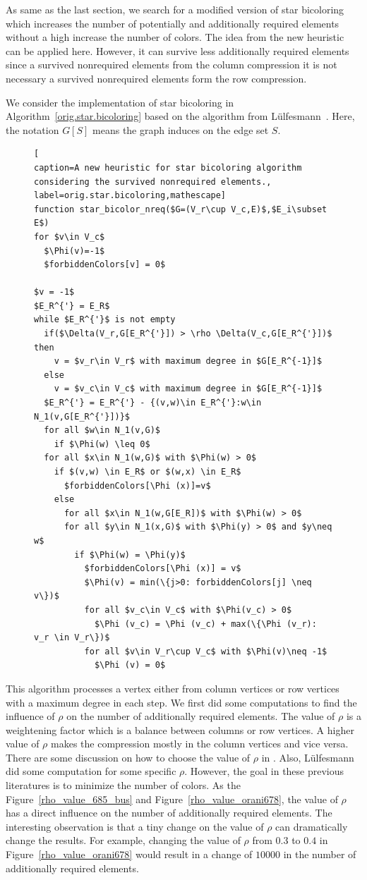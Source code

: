 \documentclass[12pt, twoside,a4paper,toc=bibliography]{scrbook}
\newcommand{\figref}[1]{Figure~\protect\ref{#1}}
\newcommand{\coderef}[1]{Algorithm~\protect\ref{#1}}
\begin{document}
As same as the last section, we search for a modified version of star bicoloring
which increases the number of potentially and additionally required elements without
a high increase the number of colors. The idea from the new heuristic
can be applied here. However, it can survive less additionally required
elements since a survived nonrequired elements from the column compression
it is not necessary a survived nonrequired elements form the row compression.

We consider the implementation of star bicoloring in \coderef{orig.star.bicoloring} based on
the algorithm from Lülfesmann~\cite{Lulfesmann2012Fap}.
Here, the notation $G[S]$ means the graph induces on the edge set $S$.
\begin{figure}
\begin{lstlisting}[
caption=A new heuristic for star bicoloring algorithm
considering the survived nonrequired elements.,
label=orig.star.bicoloring,mathescape]
function star_bicolor_nreq($G=(V_r\cup V_c,E)$,$E_i\subset E$)
for $v\in V_c$
  $\Phi(v)=-1$
  $forbiddenColors[v] = 0$

$v = -1$
$E_R^{'} = E_R$
while $E_R^{'}$ is not empty
  if($\Delta(V_r,G[E_R^{'}]) > \rho \Delta(V_c,G[E_R^{'}])$ then
    v = $v_r\in V_r$ with maximum degree in $G[E_R^{-1}]$
  else
    v = $v_c\in V_c$ with maximum degree in $G[E_R^{-1}]$
  $E_R^{'} = E_R^{'} - {(v,w)\in E_R^{'}:w\in N_1(v,G[E_R^{'}])}$
  for all $w\in N_1(v,G)$
    if $\Phi(w) \leq 0$
  for all $x\in N_1(w,G)$ with $\Phi(w) > 0$
    if $(v,w) \in E_R$ or $(w,x) \in E_R$
      $forbiddenColors[\Phi (x)]=v$
    else
      for all $x\in N_1(w,G[E_R])$ with $\Phi(w) > 0$
      for all $y\in N_1(x,G)$ with $\Phi(y) > 0$ and $y\neq w$
        if $\Phi(w) = \Phi(y)$
          $forbiddenColors[\Phi (x)] = v$
          $\Phi(v) = min(\{j>0: forbiddenColors[j] \neq v\})$
          for all $v_c\in V_c$ with $\Phi(v_c) > 0$
            $\Phi (v_c) = \Phi (v_c) + max(\{\Phi (v_r): v_r \in V_r\})$
          for all $v\in V_r\cup V_c$ with $\Phi(v)\neq -1$
            $\Phi (v) = 0$
\end{lstlisting}
\end{figure}
This algorithm processes a vertex either from column vertices
or row vertices with a maximum degree in each step.
We first did some computations to find the influence of $\rho$ on the
number of additionally required elements. The value of $\rho$ is a weightening factor which
is a balance between columns or row vertices. A higher value of $\rho$
makes the compression mostly in the column vertices and vice versa.
There are some discussion on how to choose the value of $\rho$ in
\cite{Gebremedhin05whatcolor}. Also,
Lülfesmann~\cite{Lulfesmann2012Fap,LulfesmannMaster} did some computation for some
specific $\rho$.
However, the goal in these previous literatures
is to minimize the number of colors.
As the \figref{rho_value_685_bus} and \figref{rho_value_orani678},
the value of $\rho$ has a direct influence on
the number of additionally required elements.
The interesting observation is that a tiny change
on the value of $\rho$ can dramatically change the
results. For example, changing the value of $\rho$ from
$0.3$ to $0.4$ in \figref{rho_value_orani678} would result
in a change of $10000$ in the number of additionally required elements.
\end{document}
